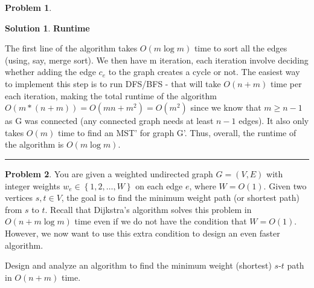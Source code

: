 \documentclass{article}
\theoremstyle{definition}
\newtheorem{problem}{Problem}
\def\fline{\rule{0.75\linewidth}{0.5pt}}
\newcommand{\finishline}{\begin{center}\fline\end{center}}
\newtheorem*{solution*}{Solution}
\newenvironment{solution}{\begin{solution*}}{{\finishline} \end{solution*}}
\newcommand{\set}[1]{\ensuremath{\left\{ #1 \right\}}}
\begin{document}
\begin{problem}
\begin{enumerate}
\begin{solution}
\item\textbf{Runtime}
\item The first line of the algorithm takes $O(m\log m)$ time to sort all the edges (using, say, merge sort).  We then have m iteration, each iteration involve deciding whether adding the edge $c_e$ to the graph creates a cycle or not.  The easiest way to implement this step is to run DFS/BFS - that will take $O(n+m)$ time per each iteration, making the total runtime of the algorithm $O(m*(n+m)) = O(mn+m^2) = O(m^2)$ since we know that $m \geq n-1$ as G was connected (any connected graph needs at least $n-1$ edges). It also only takes $O(m)$ time to find an MST' for graph G'. Thus, overall, the runtime of the algorithm is $O(m\log m)$.

\end{solution}
\end{enumerate}	
\end{problem}

\medskip


\begin{problem}
	You are given a weighted undirected graph $G=(V,E)$ with integer weights $w_e \in \set{1,2,\ldots,W}$ on each edge $e$, where $W=O(1)$. 
	Given two vertices $s,t \in V$, the goal is to find the minimum weight path (or shortest path) from $s$ to $t$. Recall that Dijkstra's algorithm solves this problem in $O(n+m\log{m})$ time even if we do not have the condition that $W=O(1)$. 
	However, we now want to use this extra condition to design an even faster algorithm. 
	
	
	Design and analyze an algorithm to find the minimum weight (shortest) $s$-$t$ path in $O(n+m)$ time.
\end{problem}

\medskip
\end{document}
